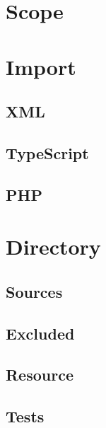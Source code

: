 \chapter{Scope}




\chapter{Import}



\section{XML}



\section{TypeScript}



\section{PHP}



\chapter{Directory}



\section{Sources}



\section{Excluded}



\section{Resource}



\section{Tests}



